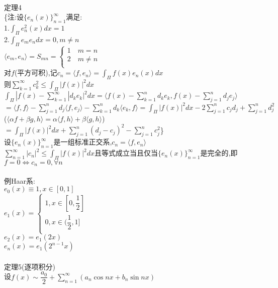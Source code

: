 \documentclass[11pt, a4paper, UTF8]{ctexart}
\begin{document}
\\
定理4\\
\{注:设$ \{e_n(x)\}_{n=1}^{\infty} $满足:\\
1.$ \int_{\Pi}e_n^2(x)dx=1 $\\
2.$ \int_{\Pi}e_me_ndx=0,m\not=n $\\
$ \langle e_m,e_n\rangle=S_{mn}=
\left\{
\begin{aligned}
1\quad m=n\\
2\quad m\not=n\\
\end{aligned}
\right. $\\
对$ f $(平方可积),记$ c_n=\langle f,e_n\rangle=\int_{\Pi}f(x)e_n(x)dx $\\
则$ \sum\limits_{k=1}^{\infty}c_k^2\le\int_{\Pi}|f(x)|^2dx $\\
$ \int_{\Pi}|f(x)-\sum\limits_{k=1}^{\infty}|d_ke_k|^2dx=\langle f(x)-\sum\limits_{k=1}^nd_ke_k,f(x)-\sum\limits_{j=1}^nd_je_j\rangle $\\
$ =\langle f,f\rangle-\sum\limits_{j=1}^nd_j\langle f,e_j\rangle-\sum\limits_{k=1}^nd_k\langle e_k,f\rangle=\int_{\Pi}|f(x)|^2dx-2\sum\limits_{j=1}^nc_jd_j+\sum\limits_{j=1}^nd_j^2 $\\
($ \langle \alpha f+\beta g,h\rangle=\alpha\langle f,h\rangle+\beta\langle g,h\rangle $)\\
$ =\int_{\Pi}|f(x)|^2dx+\sum\limits_{j=1}^n(d_j-c_j)^2-\sum\limits_{j=1}^nc_j^2 $\}\\
设$ \{e_n(x)\}_{n=1}^{\infty} $是一组标准正交系,$ c_n=\langle f,e_n\rangle $\\
$ \sum\limits_{n=1}^{\infty}|c_n|^2\le\int_{\Pi}|f(x)|^2dx $且等式成立当且仅当$ \{e_n(x)\}_{n=1}^{\infty} $是完全的,即$ f=0\Leftrightarrow c_n=0,\forall n $\\
\\
例Haar系:\\
$ e_0(x)\equiv1,x\in[0,1] $\\
$ e_1(x)=\left\{
\begin{aligned}
1,x\in[0,\dfrac{1}{2}]\\
0,x\in(\dfrac{1}{2},1]\\
\end{aligned}
\right. $\\
$ e_2(x)=e_1(2x) $\\
$ e_n(x)=e_1(2^{n-1}x) $\\
\\
定理5(逐项积分)\\
设$ f(x)\sim\dfrac{a_0}{2}+\sum\limits_{n=1}^{\infty}(a_n\cos nx+b_n\sin nx) $\\
\end{document}
